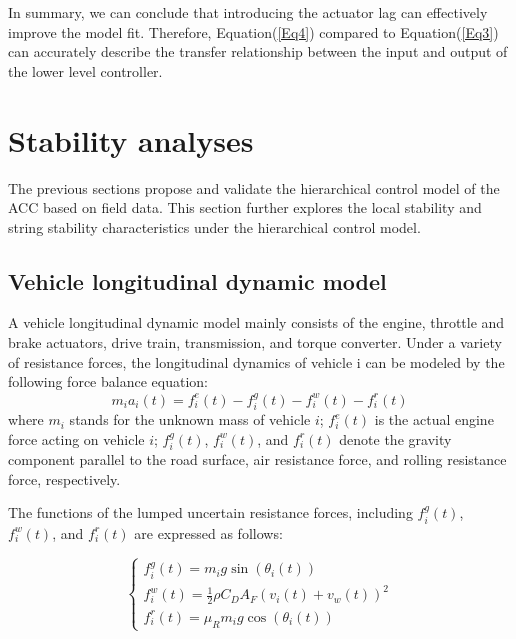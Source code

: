\documentclass[journal]{IEEEtran}
\begin{document}
In summary, we can conclude that introducing the actuator lag can effectively improve the model fit. Therefore, Equation(\ref{Eq4}) compared to Equation(\ref{Eq3}) can accurately describe the transfer relationship between the input and output of the lower level controller.






\section{Stability analyses}
\label{Section 4}

The previous sections propose and validate the hierarchical control model of the ACC based on field data. This section further explores the local stability and string stability characteristics under the hierarchical control model.

\subsection{Vehicle longitudinal dynamic model}
\label{Section 4.1}

A vehicle longitudinal dynamic model mainly consists of the engine, throttle and brake actuators, drive train, transmission, and torque converter. Under a variety of resistance forces, the longitudinal dynamics of vehicle i can be modeled by the following force balance equation:
\begin{equation}
  m_ia_i(t)=f_i^e(t)-f_i^g(t)-f_i^w(t)-f_i^r(t)
  \label{Eq13}
\end{equation}
where $m_i$ stands for the unknown mass of vehicle $i$; $f_i^e(t)$ is the actual engine force acting on vehicle $i$; $f_i^g(t)$, $f_i^w(t)$, and $f_i^r(t)$ denote the gravity component parallel to the road surface, air resistance force, and rolling resistance force, respectively.

The functions of the lumped uncertain resistance forces, including $f_i^g(t)$, $f_i^w(t)$, and $f_i^r(t)$ are expressed as follows:

\begin{equation}
  \left\{\begin{array}{l}
    f_{i}^{g}(t)=m_{i} g \sin \left(\theta_{i}(t)\right)                        \\
    f_{i}^{w}(t)=\frac{1}{2} \rho C_{D} A_{F}\left(v_{i}(t)+v_{w}(t)\right)^{2} \\
    f_{i}^{r}(t)=\mu_{R} m_{i} g \cos \left(\theta_{i}(t)\right)
  \end{array}\right.
  \label{Eq14}
\end{equation}
\end{document}
